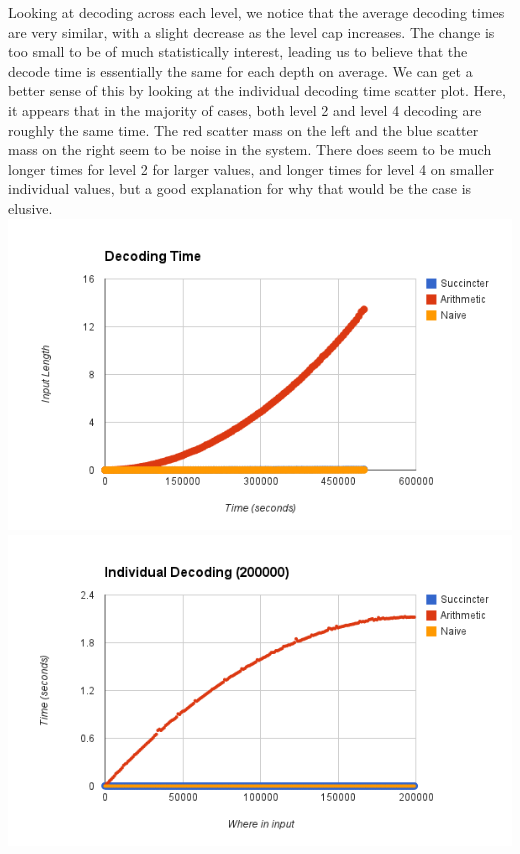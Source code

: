 \documentclass{article}
\begin{document}
Looking at decoding across each level, we notice that the average decoding times are very similar, with a slight decrease as the level cap increases. The change is too small to be of much statistically interest, leading us to believe that the decode time is essentially the same for each depth on average. We can get a better sense of this by looking at the individual decoding time scatter plot. Here, it appears that in the majority of cases, both level 2 and level 4 decoding are roughly the same time. The red scatter mass on the left and the blue scatter mass on the right seem to be noise in the system. There does seem to be much longer times for level 2 for larger values, and longer times for level 4 on smaller individual values, but a good explanation for why that would be the case is elusive.\\

\includegraphics[scale=0.4]{images/decoding_time}
\includegraphics[scale=0.4]{images/individual_decode_20000}
\afterpage{\vfill}
\end{document}
